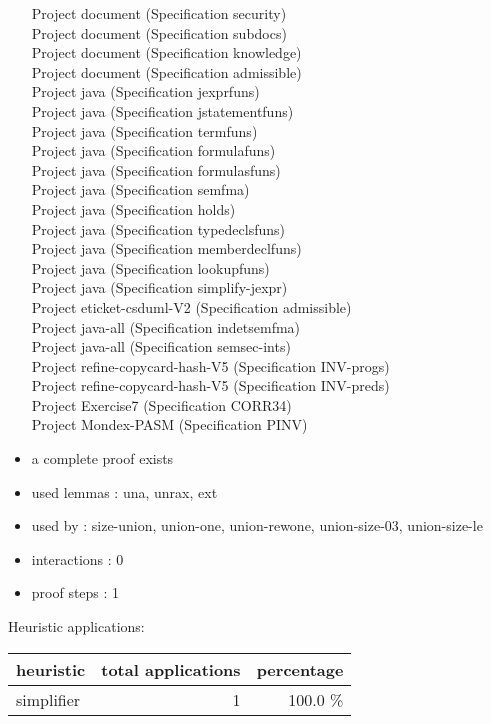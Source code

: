 \documentclass[a4paper]{article}
\begin{document}
\begin{itemize}
Project document (Specification security) \\
Project document (Specification subdocs) \\
Project document (Specification knowledge) \\
Project document (Specification admissible) \\
Project java (Specification jexprfuns) \\
Project java (Specification jstatementfuns) \\
Project java (Specification termfuns) \\
Project java (Specification formulafuns) \\
Project java (Specification formulasfuns) \\
Project java (Specification semfma) \\
Project java (Specification holds) \\
Project java (Specification typedeclsfuns) \\
Project java (Specification memberdeclfuns) \\
Project java (Specification lookupfuns) \\
Project java (Specification simplify-jexpr) \\
Project eticket-csduml-V2 (Specification admissible) \\
Project java-all (Specification indetsemfma) \\
Project java-all (Specification semsec-ints) \\
Project refine-copycard-hash-V5 (Specification INV-progs) \\
Project refine-copycard-hash-V5 (Specification INV-preds) \\
Project Exercise7 (Specification CORR34) \\
Project Mondex-PASM (Specification PINV)
\item       a complete proof exists
\item       used lemmas  : una, unrax, ext
\item       used by      : size-union, union-one, union-rewone, union-size-03, union-size-le
\item       interactions : 0
\item       proof steps  : 1
\end{itemize}

\medskip


Heuristic applications:

\begin{supertabular}{l|r|r}
heuristic	& total applications & percentage \\ \hline
simplifier & 1 & 100.0 \% \\

\end{supertabular}
\end{document}
